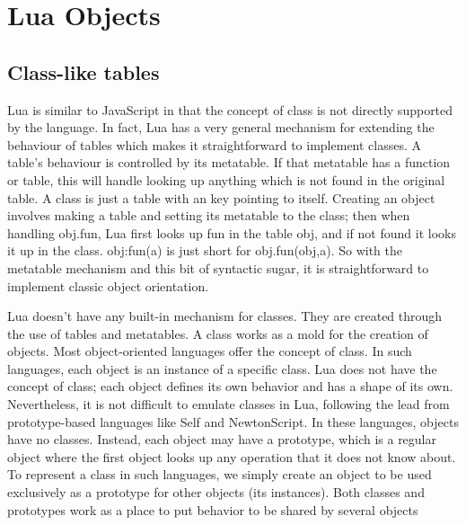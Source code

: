 
\parskip10pt

\chapter{Lua Objects}
\label{c:luaobjects}

\section{Class-like tables}
Lua is similar to JavaScript in that the concept of class is not directly supported by the language. In fact, Lua has a very general mechanism for extending the behaviour of tables which makes it straightforward to implement classes. A table’s behaviour is controlled by its metatable. If that metatable has a  function or table, this will handle looking up anything which is not found in the original table. A class is just a table with an  key pointing to itself. Creating an object involves making a table and setting its metatable to the class; then when handling obj.fun, Lua first looks up fun in the table obj, and if not found it looks it up in the class. obj:fun(a) is just short for obj.fun(obj,a). So with the metatable mechanism and this bit of syntactic sugar, it is straightforward to implement classic object orientation.

Lua doesn't have any built-in mechanism for classes. They are created through the use of tables
and metatables. A class works as a mold for the creation of objects. Most object-oriented languages
offer the concept of class. In such languages, each object is an instance
of a specific class. Lua does not have the concept of class; each object defines
its own behavior and has a shape of its own. Nevertheless, it is not difficult to
emulate classes in Lua, following the lead from prototype-based languages like
Self and NewtonScript. In these languages, objects have no classes. Instead,
each object may have a prototype, which is a regular object where the first object
looks up any operation that it does not know about. To represent a class in
such languages, we simply create an object to be used exclusively as a prototype
for other objects (its instances). Both classes and prototypes work as a place to
put behavior to be shared by several objects

